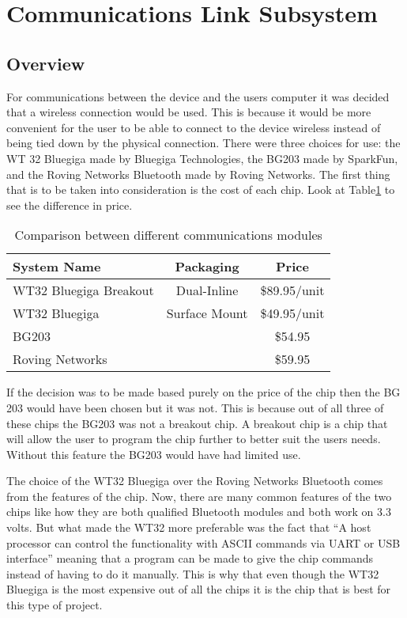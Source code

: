 \section[Wireless Communication]{Communications Link Subsystem}
\subsection{Overview}
For communications between the device and the users computer it was decided 
that a wireless connection would be used.  This is because it would be more 
convenient for the user to be able to connect to the device wireless instead of
 being tied down by the physical connection.  There were three choices for use:
 the WT 32 Bluegiga made by Bluegiga Technologies, the BG203 made by SparkFun, 
and the Roving Networks Bluetooth made by Roving Networks.  The first thing 
that is to be taken into consideration is the cost of each chip. Look at 
Table\ref{tab:bt_prices} to see the difference in price.

\begin{table}[hbp]
\caption{Comparison between different communications modules \cite{web:wt32-price}\cite{web:bg203-price}\cite{web:roving-price}}
\begin{tabular}{l | c c } 
	System Name & Packaging & Price \\\hline
	WT32 Bluegiga Breakout & Dual-Inline & \$89.95/unit \\
	WT32 Bluegiga & Surface Mount & \$49.95/unit \\
	BG203 & & \$54.95 \\
	Roving Networks & & \$59.95
\end{tabular}
\label{tab:bt_prices}
\end{table}

If the decision was to be made based purely on the price of the chip then the 
BG 203 would have been chosen but it was not.  This is because out of all three
 of these chips the BG203 was not a breakout chip.  A breakout chip is a chip 
that will allow the user to program the chip further to better suit the users 
needs.  Without this feature the BG203 would have had limited use.

The choice of the WT32 Bluegiga over the Roving Networks Bluetooth comes from 
the features of the chip.  Now, there are many common features of the two chips
 like how they are both qualified Bluetooth modules and both work on 3.3 volts.
  But what made the WT32 more preferable was the fact that ``A host processor 
can control the functionality with ASCII commands via UART or USB 
interface'' meaning that a program can be made to give the chip commands 
instead of having to do it manually\cite{web:wt32-price}.  This is why that 
even though the WT32 Bluegiga is the most expensive out of all the chips it is 
the chip that is best for this type of project. 

